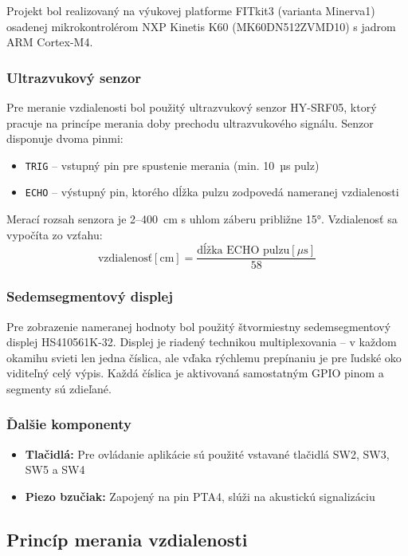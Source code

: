 \documentclass[11pt, a4paper,slovak]{article}
\begin{document}
Projekt bol realizovaný na výukovej platforme FITkit3 (varianta Minerva1) osadenej mikrokontrolérom NXP Kinetis K60 (MK60DN512ZVMD10) s jadrom ARM Cortex-M4.

\subsubsection{Ultrazvukový senzor}

Pre meranie vzdialenosti bol použitý ultrazvukový senzor HY-SRF05, ktorý pracuje na princípe merania doby prechodu ultrazvukového signálu. Senzor disponuje dvoma pinmi:
\begin{itemize}
    \item \texttt{TRIG} -- vstupný pin pre spustenie merania (min. 10~µs pulz)
    \item \texttt{ECHO} -- výstupný pin, ktorého dĺžka pulzu zodpovedá nameranej vzdialenosti
\end{itemize}

Merací rozsah senzora je 2--400~cm s uhlom záberu približne 15°. Vzdialenosť sa vypočíta zo vzťahu:
\[ \text{vzdialenosť}[\text{cm}] = \frac{\text{dĺžka ECHO pulzu}[\mu\text{s}]}{58} \]

\subsubsection{Sedemsegmentový displej}

Pre zobrazenie nameranej hodnoty bol použitý štvormiestny sedemsegmentový displej HS410561K-32. Displej je riadený technikou multiplexovania -- v každom okamihu svieti len jedna číslica, ale vďaka rýchlemu prepínaniu je pre ľudské oko viditeľný celý výpis. Každá číslica je aktivovaná samostatným GPIO pinom a segmenty sú zdieľané.

\subsubsection{Ďalšie komponenty}

\begin{itemize}
    \item \textbf{Tlačidlá:} Pre ovládanie aplikácie sú použité vstavané tlačidlá SW2, SW3, SW5 a SW4
    \item \textbf{Piezo bzučiak:} Zapojený na pin PTA4, slúži na akustickú signalizáciu
\end{itemize}

\subsection{Princíp merania vzdialenosti}
\end{document}
